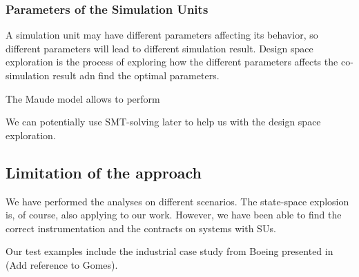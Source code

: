 \subsubsection{Parameters of the Simulation Units}
A simulation unit may have different parameters affecting its behavior, so different parameters will lead to different simulation result.
Design space exploration is the process of exploring how the different parameters affects the co-simulation result adn find the optimal parameters. 

The Maude model allows to perform






We can potentially use SMT-solving later to help us with the design space exploration.

\subsection{Limitation of the approach}
We have performed the analyses on different scenarios. 
The state-space explosion is, of course, also applying to our work. 
However, we have been able to find the correct instrumentation and the contracts on systems with  SUs.

Our test examples include the industrial case study from Boeing presented in (Add reference to Gomes). 